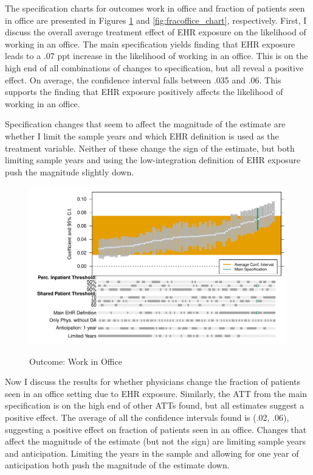 \documentclass[12pt]{article}
\begin{document}
The specification charts for outcomes work in office and fraction of patients seen in office are presented in Figures \ref{fig:work_chart} and \ref{fig:fracoffice_chart}, respectively. First, I discuss the overall average treatment effect of EHR exposure on the likelihood of working in an office. The main specification yields finding that EHR exposure leads to a .07 ppt increase in the likelihood of working in an office. This is on the high end of all combinations of changes to specification, but all reveal a positive effect. On average, the confidence interval falls between .035 and .06. This supports the finding that EHR exposure positively affects the likelihood of working in an office.  

Specification changes that seem to affect the magnitude of the estimate are whether I limit the sample years and which EHR definition is used as the treatment variable. Neither of these change the sign of the estimate, but both limiting sample years and using the low-integration definition of EHR exposure push the magnitude slightly down.  

\begin{figure}[ht]
    \centering
    \caption{Outcome: Work in Office}
    \includegraphics[scale=.7]{Objects/office_ind_chart.pdf}
    \label{fig:work_chart}
\end{figure}

Now I discuss the results for whether physicians change the fraction of patients seen in an office setting due to EHR exposure. Similarly, the ATT from the main specification is on the high end of other ATTs found, but all estimates suggest a positive effect. The average of all the confidence intervals found is (.02, .06), suggesting a positive effect on fraction of patients seen in an office. Changes that affect the magnitude of the estimate (but not the sign) are limiting sample years and anticipation. Limiting the years in the sample and allowing for one year of anticipation both push the magnitude of the estimate down. 
\end{document}
